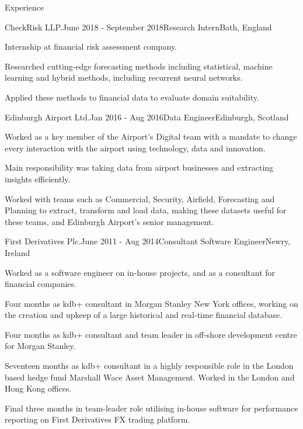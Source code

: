 \documentclass{resume} %
\begin{document}
\begin{rSection}{Experience}
  \begin{rSubsection}{CheckRisk LLP.}{June 2018 - September 2018}{Research Intern}{Bath, England}
    \item Internship at financial risk assessment company.
    \item Researched cutting-edge forecasting methods including statistical, machine learning and hybrid methods, including recurrent neural networks.
    \item Applied these methods to financial data to evaluate domain suitability.
  \end{rSubsection}

  \begin{rSubsection}{Edinburgh Airport Ltd.}{Jan 2016 - Aug 2016}{Data Engineer}{Edinburgh, Scotland}
    \item Worked as a key member of the Airport's Digital team with a mandate to change every interaction with the airport using technology, data and innovation.
    \item Main responsibility was taking data from airport businesses and extracting insights efficiently.
    \item Worked with teams such as Commercial, Security, Airfield, Forecasting and Planning to extract, transform and load data, making these datasets useful for these teams, and Edinburgh Airport’s senior management.
  \end{rSubsection}

  \begin{rSubsection}{First Derivatives Plc.}{June 2011 - Aug 2014}{Consultant Software Engineer}{Newry, Ireland}
    \item Worked as a software engineer on in-house projects, and as a consultant for financial companies.
    \item Four months as kdb+ consultant in Morgan Stanley New York offices, working on the creation and upkeep of a large historical and real-time financial database.
    \item Four months as kdb+ consultant and team leader in off-shore development centre for Morgan Stanley.
    \item Seventeen months as kdb+ consultant in a highly responsible role in the London based hedge fund Marshall Wace Asset Management. Worked in the London and Hong Kong offices.
    \item Final three months in team-leader role utilising in-house software for performance reporting on First Derivatives FX trading platform.
  \end{rSubsection}


\end{rSection}
\end{document}
